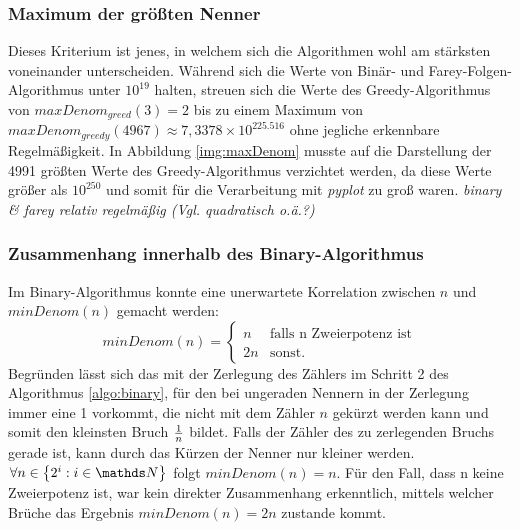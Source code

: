 \subsubsection{Maximum der größten Nenner}
Dieses Kriterium ist jenes, in welchem sich die Algorithmen wohl am stärksten voneinander unterscheiden. Während sich die Werte von Binär- und Farey-Folgen-Algorithmus unter $10^{19}$ halten, streuen sich die Werte des Greedy-Algorithmus von $maxDenom_{greed}(3) = 2$ bis zu einem Maximum von $maxDenom_{greedy}(4967) \approx 7,3378 \times 10^{225.516}$ ohne jegliche erkennbare Regelmäßigkeit. In Abbildung \ref{img:maxDenom} musste auf die Darstellung der 4991 größten Werte des Greedy-Algorithmus verzichtet werden, da diese Werte größer als $10^{250}$ und somit für die Verarbeitung mit \emph{pyplot} zu groß waren. \emph{binary \& farey relativ regelmäßig (Vgl. quadratisch o.ä.?)}

\subsubsection{Zusammenhang innerhalb des Binary-Algorithmus}
Im Binary-Algorithmus konnte eine unerwartete Korrelation zwischen $n$ und $minDenom(n)$ gemacht werden:
\begin{equation*}
	minDenom(n) = 
	\begin{cases}
		n & \text{falls n Zweierpotenz ist} \\
		2n & \text{sonst.}
	\end{cases}
\end{equation*}
Begründen lässt sich das mit der Zerlegung des Zählers im Schritt 2 des Algorithmus \ref{algo:binary}, für den bei ungeraden Nennern in der Zerlegung immer eine 1 vorkommt, die nicht mit dem Zähler $n$ gekürzt werden kann und somit den kleinsten Bruch $\frac{1}{n}$ bildet. Falls der Zähler des zu zerlegenden Bruchs gerade ist, kann durch das Kürzen der Nenner nur kleiner werden. $\forall n \in \left\{2^i : i\in \N \right\}$ folgt $minDenom(n) = n$. Für den Fall, dass n keine Zweierpotenz ist, war kein direkter Zusammenhang erkenntlich, mittels welcher Brüche das Ergebnis $minDenom(n) = 2n$ zustande kommt.

